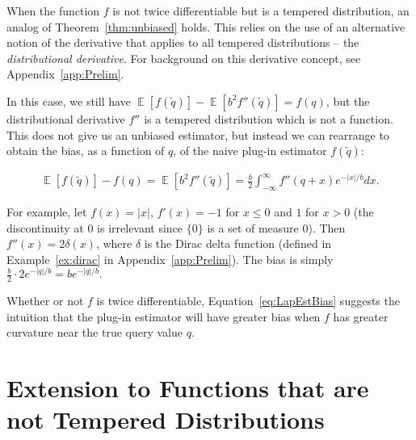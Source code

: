 \documentclass[11pt]{article}
\newcommand{\E}{\operatorname{\mathbb{E}}}
\begin{document}
\begin{remark} \label{rem:fNot2Diff}
When the function $f$ is not twice differentiable but is a tempered distribution, an analog of Theorem~\ref{thm:unbiased} holds. This relies on the use of an alternative notion of the derivative that applies to all tempered distributions -- the \textit{distributional derivative}. For background on this derivative concept, see Appendix~\ref{app:Prelim}.

In this case, we still have $\E[f(\tilde{q})] - \E[b^2 f''(\tilde{q})] = f(q)$, but the distributional derivative $f''$ is a tempered distribution which is not a function. This does not give us an unbiased estimator, but instead we can rearrange to obtain the bias, as a function of $q$, of the naive plug-in estimator $f(\tilde{q})$:

\begin{align} \label{eq:LapEstBias}
    \E[f(\tilde{q})] - f(q) = \E[b^2 f''(\tilde{q})] = \frac{b}{2} \int_{-\infty}^\infty f''(q + x)  e^{-|x|/b} dx.
    \end{align}


For example, let $f(x) = |x|$, $f'(x) = -1$ for $x \le 0$ and $1$ for $x > 0$ (the discontinuity at 0 is irrelevant since $\{0\}$ is a set of measure 0). Then $f''(x) = 2 \delta(x)$, where $\delta$ is the Dirac delta function (defined in Example~\ref{ex:dirac} in Appendix~\ref{app:Prelim}). The bias is simply $\frac{b}{2} \cdot 2 e^{-|q|/b} = b e^{-|q|/b}.$

Whether or not $f$ is twice differentiable, Equation~\ref{eq:LapEstBias} suggests the intuition that the plug-in estimator will have greater bias when $f$ has greater curvature near the true query value $q$.
\end{remark}


\section{Extension to Functions that are not Tempered Distributions}
\label{sec:unbiasLaplaceNonTempDist}
\end{document}
